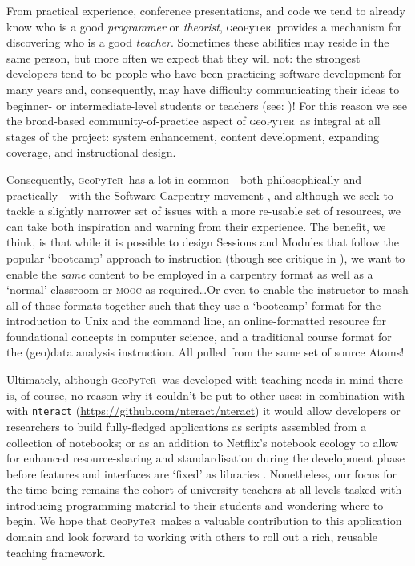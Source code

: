 \documentclass[letter, 11pt,titlepage]{article}
\newcommand{\gp}{\textsc{g}eo\textsc{p}y\textsc{t}e\textsc{r}~\/}
\begin{document}
From practical experience, conference presentations, and code we tend to already know who is a good \emph{programmer} or \emph{theorist}, \gp provides a mechanism for discovering who is a good \emph{teacher}. Sometimes these abilities may reside in the same person, but more often we expect that they will not: the strongest developers tend to be people who have been practicing software development for many years and, consequently, may have difficulty communicating their ideas to beginner- or intermediate-level students or teachers (see: \citealp{Chapman:2010aa})! For this reason we see the broad-based community-of-practice aspect of \gp as integral at all stages of the project: system enhancement, content development, expanding coverage, and instructional design.

Consequently, \gp has a lot in common---both philosophically and practically---with the Software Carpentry movement \citep{SCF2016}, and although we seek to tackle a slightly narrower set of issues with a more re-usable set of resources, we can take both inspiration and warning from their experience. The benefit, we think, is that while it is possible to design Sessions and Modules that follow the popular `bootcamp' approach to instruction (though see critique in \citealp{Feldon2017}), we want to enable the \emph{same} content to be employed in a carpentry format as well as a `normal' classroom or \textsc{mooc} as required\ldots Or even to enable the instructor to mash all of those formats together such that they use a `bootcamp' format for the introduction to Unix and the command line, an online-formatted resource for foundational concepts in computer science, and a traditional course format for the (geo)data analysis instruction. All pulled from the same set of source Atoms!

Ultimately, although \gp was developed with teaching needs in mind there is, of course, no reason why it couldn't be put to other uses: in combination with with \texttt{nteract} (\url{https://github.com/nteract/nteract}) it would allow developers or researchers to build fully-fledged applications as scripts assembled from a collection of notebooks; or as an addition to Netflix's notebook ecology to allow for enhanced resource-sharing and standardisation during the development phase before features and interfaces are `fixed' as libraries \citep{Ufford2018}. Nonetheless, our focus for the time being remains the cohort of university teachers at all levels tasked with introducing programming material to their students and wondering where to begin. We hope that \gp makes a valuable contribution to this application domain and look forward to working with others to roll out a rich, reusable teaching framework.



\end{document}
